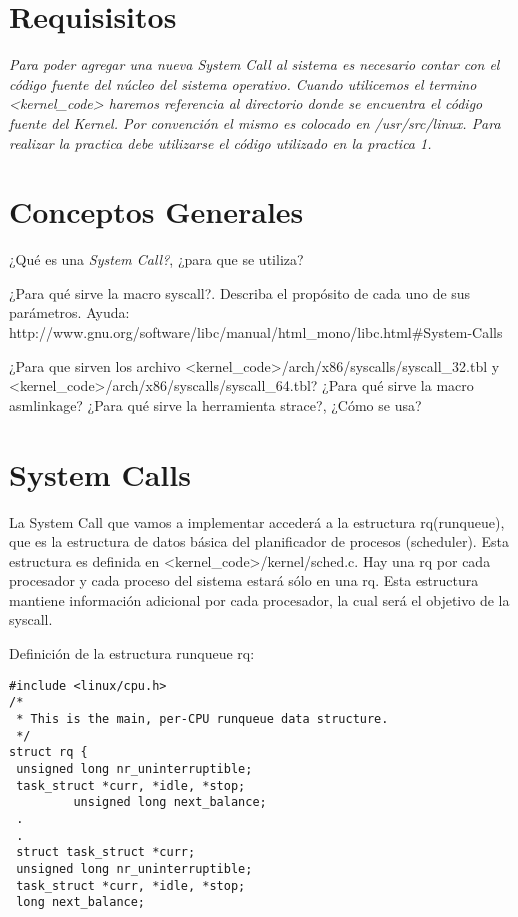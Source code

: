 \section{Requisisitos}
\textit{
Para poder agregar una nueva System Call al sistema es necesario contar con el 
código fuente del núcleo del sistema operativo. Cuando utilicemos el termino 
<kernel\_code> haremos referencia al directorio donde se encuentra el código fuente 
del Kernel.  Por convención el mismo es colocado en /usr/src/linux.  Para realizar 
la practica debe utilizarse el código utilizado en la practica 1.}
\section{Conceptos Generales}
\begin{questions}
  \question ¿Qué es una \textit{System Call?}, ¿para que se utiliza?

  \question ¿Para qué sirve la macro syscall?. Describa el propósito de cada uno 
            de sus parámetros. 
            Ayuda: http://www.gnu.org/software/libc/manual/html\_mono/libc.html\#System-Calls

   \question ¿Para que sirven los archivo <kernel\_code>/arch/x86/syscalls/syscall\_32.tbl y 
             <kernel\_code>/arch/x86/syscalls/syscall\_64.tbl?
   \question ¿Para qué sirve la macro asmlinkage?
   \question ¿Para qué sirve la herramienta strace?, ¿Cómo se usa?
\end{questions}
\section{System Calls}

La System Call que vamos a implementar accederá a la estructura rq(runqueue), que es la estructura
de datos básica del planificador de procesos (scheduler). Esta estructura es definida en 
<kernel\_code>/kernel/sched.c. Hay una rq por cada procesador y cada proceso del sistema estará sólo 
en una rq. Esta estructura mantiene información adicional por cada procesador, la cual será el objetivo
de la syscall.

Definición de la estructura runqueue rq:
\begin{verbatim}
#include <linux/cpu.h>
/*
 * This is the main, per-CPU runqueue data structure.
 */
struct rq {
 unsigned long nr_uninterruptible;
 task_struct *curr, *idle, *stop;
         unsigned long next_balance;
 .
 .
 struct task_struct *curr;
 unsigned long nr_uninterruptible;
 task_struct *curr, *idle, *stop;
 long next_balance;
\end{verbatim}



